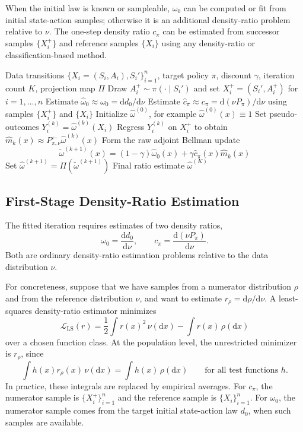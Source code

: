 \documentclass{article}
\newcommand{\mhat}{\widehat m}
\newcommand{\1}{\mathbf{1}}
\newcommand{\dd}{\mathrm{d}}
\newcommand{\cpi}{c_\pi}
\newcommand{\omegazero}{\omega_0}
\newcommand{\omegahatzero}{\widehat{\omega}_0}
\newcommand{\Pback}{P_{\pi,\nu}^{\leftarrow}}
\newcommand{\Mpi}{\Pback}
\newcommand{\Ppi}{P_\pi}
\newcommand{\dinit}{d_0}
\newcommand{\omegahat}{\widehat{\omega}}
\newcommand{\omegatilde}{\widetilde{\omega}}
\newcommand{\chat}{\widehat{c}_\pi}
\newcommand{\Proj}{\Pi}
\theoremstyle{plain}
\theoremstyle{definition}
\theoremstyle{remark}
\begin{document}
When the initial law is known or sampleable, $\omegazero$ can be computed or fit
from initial state-action samples; otherwise it is an additional density-ratio
problem relative to $\nu$. The one-step density ratio $\cpi$ can be estimated from
successor samples $\{X_i^+\}$ and reference samples $\{X_i\}$ using any
density-ratio or classification-based method.

\begin{algorithm}[t]
\caption{\textsc{FORI}: Fitted Occupancy-Ratio Iteration}
\label{alg:fori}
\begin{algorithmic}[1]
\Require Data transitions $\{X_i=(S_i,A_i),S_i'\}_{i=1}^n$, target policy $\pi$, discount $\gamma$, iteration count $K$, projection map $\Proj$
\State Draw $A_i^+\sim \pi(\cdot\mid S_i')$ and set $X_i^+=(S_i',A_i^+)$ for $i=1,\ldots,n$
\State Estimate $\omegahatzero\approx \omegazero=\dd\dinit/\dd\nu$
\State Estimate $\chat\approx \cpi=\dd(\nu\Ppi)/\dd\nu$ using samples $\{X_i^+\}$ and $\{X_i\}$
\State Initialize $\omegahat^{(0)}$, for example $\omegahat^{(0)}(x)\equiv 1$
    \State Set pseudo-outcomes $Y_i^{(k)}=\omegahat^{(k)}(X_i)$
    \State Regress $Y_i^{(k)}$ on $X_i^+$ to obtain $\mhat_k(x)\approx \Mpi\omegahat^{(k)}(x)$
    \State Form the raw adjoint Bellman update
    \[
        \omegatilde^{(k+1)}(x)
        =
        (1-\gamma)\omegahatzero(x)+\gamma \chat(x)\mhat_k(x)
    \]
    \State Set $\omegahat^{(k+1)}=\Proj(\omegatilde^{(k+1)})$
\EndFor
\Ensure Final ratio estimate $\omegahat^{(K)}$
\end{algorithmic}
\end{algorithm}

\subsection{First-Stage Density-Ratio Estimation}
\label{sec:first-stage-ratios}

The fitted iteration requires estimates of two density ratios,
\[
    \omegazero=\frac{\dd\dinit}{\dd\nu},
    \qquad
    \cpi=\frac{\dd(\nu\Ppi)}{\dd\nu}.
\]
Both are ordinary density-ratio estimation problems relative to the data
distribution $\nu$.

For concreteness, suppose that we have samples from a numerator distribution
$\rho$ and from the reference distribution $\nu$, and want to estimate
$r_\rho=\dd\rho/\dd\nu$. A least-squares density-ratio estimator minimizes
\[
    \mathcal L_{\mathrm{LS}}(r)
    =
    \frac12 \int r(x)^2\,\nu(\dd x)
    -
    \int r(x)\,\rho(\dd x)
\]
over a chosen function class. At the population level, the unrestricted
minimizer is $r_\rho$, since
\[
    \int h(x) r_\rho(x)\,\nu(\dd x)
    =
    \int h(x)\,\rho(\dd x)
    \qquad
    \text{for all test functions } h .
\]
In practice, these integrals are replaced by empirical averages. For $\cpi$,
the numerator sample is $\{X_i^+\}_{i=1}^n$ and the reference sample is
$\{X_i\}_{i=1}^n$. For $\omegazero$, the numerator sample comes from the target
initial state-action law $\dinit$, when such samples are available.
\end{document}
